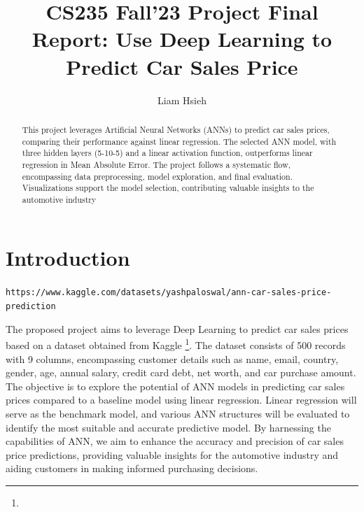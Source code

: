 \documentclass[sigplan,screen]{acmart}
\begin{document}
\title{CS235 Fall'23 Project Final Report: Use Deep Learning to Predict Car Sales Price}

\author{Liam Hsieh}

\renewcommand{\shortauthors}{Liam Y. Hsieh}

\begin{abstract}
This project leverages Artificial Neural Networks (ANNs) to predict car sales prices, comparing their performance against linear regression. The selected ANN model, with three hidden layers (5-10-5) and a linear activation function, outperforms linear regression in Mean Absolute Error. The project follows a systematic flow, encompassing data preprocessing, model exploration, and final evaluation. Visualizations support the model selection, contributing valuable insights to the automotive industry
\end{abstract}



\maketitle

\section{Introduction}

\urldef{\dataurl}\nolinkurl{https://www.kaggle.com/datasets/yashpaloswal/ann-car-sales-price-prediction}

The proposed project aims to leverage Deep Learning to predict car sales prices based on a dataset obtained from Kaggle \footnote{\dataurl}. The dataset consists of 500 records with 9 columns, encompassing customer details such as name, email, country, gender, age, annual salary, credit card debt, net worth, and car purchase amount. The objective is to explore the potential of ANN models in predicting car sales prices compared to a baseline model using linear regression. Linear regression will serve as the benchmark model, and various ANN structures will be evaluated to identify the most suitable and accurate predictive model. By harnessing the capabilities of ANN, we aim to enhance the accuracy and precision of car sales price predictions, providing valuable insights for the automotive industry and aiding customers in making informed purchasing decisions.
\end{document}
